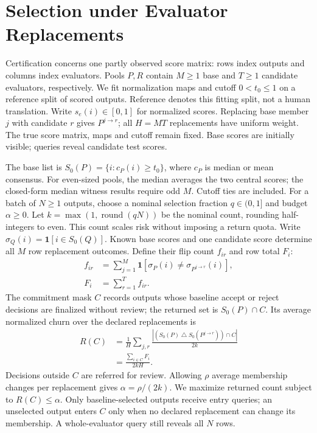 \documentclass[11pt]{article}
\newcommand{\one}{\mathbf{1}}
\newcommand{\SD}{\mathbin{\triangle}}
\begin{document}
\section{Selection under Evaluator Replacements}
\label{sec:setting}
Certification concerns one partly observed score matrix: rows index outputs and columns index evaluators. Pools $P,R$ contain $M\ge1$ base and $T\ge1$ candidate evaluators, respectively. We fit normalization maps and cutoff $0<t_0\le1$ on a reference split of scored outputs. Reference denotes this fitting split, not a human translation. Write $s_e(i)\in[0,1]$ for normalized scores. Replacing base member $j$ with candidate $r$ gives $P^{j\to r}$; all $H=MT$ replacements have uniform weight. The true score matrix, maps and cutoff remain fixed. Base scores are initially visible; queries reveal candidate test scores.

The base list is $S_0(P)=\{i:c_P(i)\ge t_0\}$, where $c_P$ is median or mean consensus. For even-sized pools, the median averages the two central scores; the closed-form median witness results require odd $M$. Cutoff ties are included. For a batch of $N\ge1$ outputs, choose a nominal selection fraction $q\in(0,1]$ and budget $\alpha\ge0$. Let $k=\max(1,\operatorname{round}(qN))$ be the nominal count, rounding half-integers to even. This count scales risk without imposing a return quota. Write $\sigma_Q(i)=\one[i\in S_0(Q)]$. Known base scores and one candidate score determine all $M$ row replacement outcomes. Define their flip count $f_{ir}$ and row total $F_i$:
{\allowdisplaybreaks{}
\begin{align}
 f_{ir}&=\sum_{j=1}^{M}\one[\sigma_P(i)\ne\sigma_{P^{j\to r}}(i)],\nonumber\\
 F_i&=\sum_{r=1}^{T}f_{ir}.
 \label{eq:cost}
\end{align}}
The commitment mask $C$ records outputs whose baseline accept or reject decisions are finalized without review; the returned set is $S_0(P)\cap C$. Its average normalized churn over the declared replacements is
\begin{align}
 R(C)&=\frac1H\sum_{j,r}\frac{|(S_0(P)\SD S_0(P^{j\to r}))\cap C|}{2k}\nonumber\\
 &=\frac{\sum_{i\in C}F_i}{2kH}.
 \label{eq:risk}
\end{align}
Decisions outside $C$ are referred for review. Allowing $\rho$ average membership changes per replacement gives $\alpha=\rho/(2k)$. We maximize returned count subject to $R(C)\le\alpha$. Only baseline-selected outputs receive entry queries; an unselected output enters $C$ only when no declared replacement can change its membership. A whole-evaluator query still reveals all $N$ rows.
\end{document}
